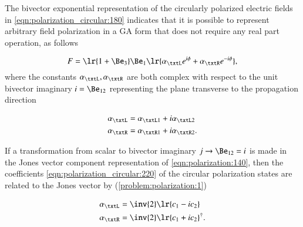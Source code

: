 The bivector exponential representation of the circularly polarized electric fields in \cref{eqn:polarization_circular:180} indicates that it is possible to represent arbitrary field polarization in a GA form that does not require any real part operation, as follows

\begin{dmath}\label{eqn:polarization_circular:200}
F = \lr{ 1 + \Be_3 } \Be_1 \lr{ \alpha_\txtL e^{i\phi} + \alpha_\txtR e^{-i\phi} },
\end{dmath}
where the constants \( \alpha_\txtL, \alpha_\txtR \) are both complex with respect to the unit bivector imaginary \( i = \Be_{12} \) representing the plane transverse to the propagation direction

\begin{dmath}\label{eqn:polarization_circular:220}
\begin{aligned}
\alpha_\txtL &= \alpha_{\txtL 1} + i \alpha_{\txtL 2} \\
\alpha_\txtR &= \alpha_{\txtR 1} + i \alpha_{\txtR 2}.
\end{aligned}
\end{dmath}

If a transformation from scalar to bivector imaginary \( j \rightarrow \Be_{12} = i \) is made in the Jones vector component representation of \cref{eqn:polarization:140},
then
the coefficients \cref{eqn:polarization_circular:220} of the circular polarization states are related to the Jones vector by (\cref{problem:polarization:1})

\begin{dmath}\label{eqn:polarization_circular:260}
\begin{aligned}
\alpha_\txtL &= \inv{2}\lr{ c_1 - i c_2 } \\
\alpha_\txtR &= \inv{2}\lr{ c_1 + i c_2 }^\dagger.
\end{aligned}
\end{dmath}
